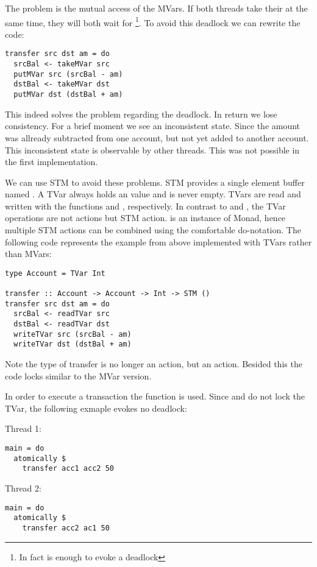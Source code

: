 The problem is the mutual access of the MVars. If both threads take their  at the same time, they will both wait for 
\footnote{In fact is  enough to evoke a deadlock}. To avoid this deadlock we can rewrite the code:
\begin{lstlisting}
transfer src dst am = do
  srcBal <- takeMVar src
  putMVar src (srcBal - am)
  dstBal <- takeMVar dst
  putMVar dst (dstBal + am)
\end{lstlisting}
This indeed solves the problem regarding the deadlock. In return we lose consistency. For a brief moment we see an inconsistent state. Since
the amount was allready subtracted from one account, but not yet added to another account. This inconsistent state is observable by other 
threads. This was not possible in the first implementation. 

We can use STM to avoid these problems. STM provides a single element buffer named . A TVar always holds an value and is never 
empty. TVars are read and written with the functions  and , respectively. 
In contrast to  and , the TVar operations are not  actions but STM action. 
 is an instance of Monad, hence multiple STM actions can be combined
using the comfortable do-notation. The following code represents the example from above implemented with TVars rather than MVars:
\begin{lstlisting}
type Account = TVar Int

transfer :: Account -> Account -> Int -> STM ()
transfer src dst am = do
  srcBal <- readTVar src
  dstBal <- readTVar dst
  writeTVar src (srcBal - am)
  writeTVar dst (dstBal + am)
\end{lstlisting}
Note the type of transfer is no longer an  action, but an  action. Besided this the code locks
similar to the MVar version.

In order to execute a transaction the function  is used. 
Since  and  do not lock the TVar, the following exmaple evokes no deadlock:
\par\noindent
\begin{minipage}[t]{.45\textwidth}
Thread 1:
\begin{lstlisting}[frame=lrtb]
main = do
  atomically $
    transfer acc1 acc2 50
\end{lstlisting}
\end{minipage}
\hfill
\begin{minipage}[t]{.45\textwidth}
Thread 2:
\begin{lstlisting}[frame=lrtb]
main = do 
  atomically $ 
    transfer acc2 ac1 50
\end{lstlisting}
\end{minipage}

